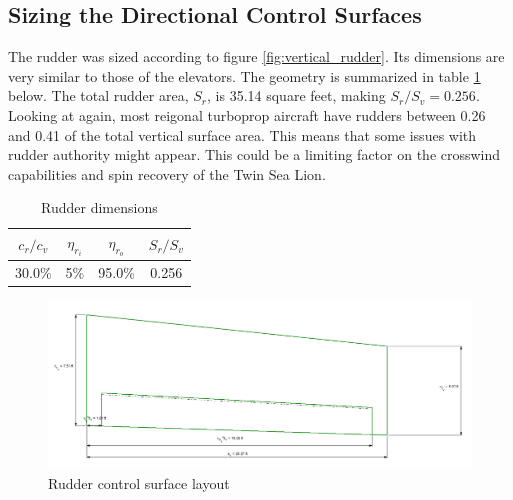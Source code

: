 \documentclass[conf]{new-aiaa}
\begin{document}
\subsection{Sizing the Directional Control Surfaces}

The rudder was sized according to figure \ref{fig:vertical_rudder}. Its dimensions are very similar to those of the elevators. The geometry is summarized in table \ref{tab:rudder_size_table} below. The total rudder area, $S_r$, is 35.14 square feet, making $S_r/S_v = 0.256$. Looking at \cite{orange_book} again, most reigonal turboprop aircraft have rudders between 0.26 and 0.41 of the total vertical surface area. This means that some issues with rudder authority might appear. This could be a limiting factor on the crosswind capabilities and spin recovery of the Twin Sea Lion.

\begin{table}[H]
\centering
\caption{Rudder dimensions}
\begin{tabular}{|c|c|c|c|}\hline
    $c_r/c_v$ & $\eta_{r_i}$ & $\eta_{r_o}$ & $S_r/S_v$ \\ \hline
    30.0\%    & 5\%          & 95.0\%       & 0.256     \\ \hline
\end{tabular}
\label{tab:rudder_size_table}
\end{table}

\begin{figure}[H]
    \includegraphics[width=\textwidth]{Report3Printouts/Empannage/Vertical_rudder_plot.png}
    \caption{Rudder control surface layout}
    \label{fig:vertical_rudder_plot}
\end{figure}
\end{document}
